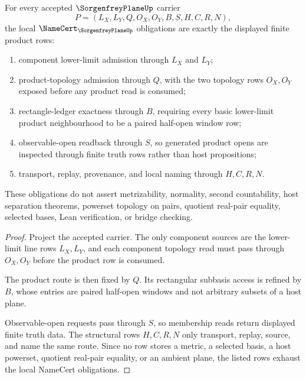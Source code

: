 \begin{theorem}
\label{thm:sorgenfrey-plane-namecert-obligations}
For every accepted $\SorgenfreyPlaneUp$ carrier
$$
P=(L_X,L_Y,Q,O_X,O_Y,B,S,H,C,R,N),
$$
the local $\NameCert_{\SorgenfreyPlaneUp}$ obligations are exactly the displayed finite product rows:
\begin{enumerate}
\item component lower-limit admission through $L_X$ and $L_Y$;
\item product-topology admission through $Q$, with the two topology rows $O_X,O_Y$ exposed before any product read is consumed;
\item rectangle-ledger exactness through $B$, requiring every basic lower-limit product neighbourhood to be a paired half-open window row;
\item observable-open readback through $S$, so generated product opens are inspected through finite truth rows rather than host propositions;
\item transport, replay, provenance, and local naming through $H,C,R,N$.
\end{enumerate}
These obligations do not assert metrizability, normality, second countability, host separation theorems, powerset topology on pairs, quotient real-pair equality, selected bases, Lean verification, or bridge checking.
\end{theorem}
\begin{proof}
Project the accepted carrier. The only component sources are the lower-limit line rows $L_X,L_Y$, and each component topology read must pass through $O_X,O_Y$ before the product row is consumed.

The product route is then fixed by $Q$. Its rectangular subbasis access is refined by $B$, whose entries are paired half-open windows and not arbitrary subsets of a host plane.

Observable-open requests pass through $S$, so membership reads return displayed finite truth data. The structural rows $H,C,R,N$ only transport, replay, source, and name the same route. Since no row stores a metric, a selected basis, a host powerset, quotient real-pair equality, or an ambient plane, the listed rows exhaust the local NameCert obligations.
\end{proof}

